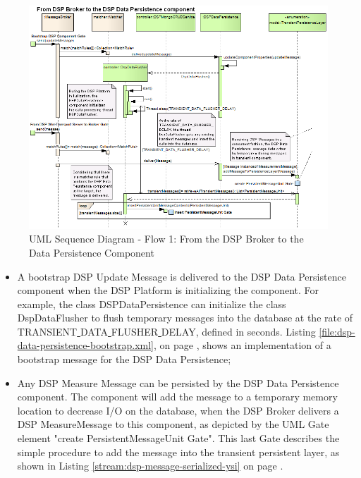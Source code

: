 \begin{figure}[!h]
  \centering
  \includegraphics[scale=0.6]{../diagrams/From-DSP-Broker-To-DSPDataPersistence-General-Sequence} 
  \caption{UML Sequence Diagram - Flow 1: From the DSP Broker to the Data Persistence Component}
  \label{fig:From-DSP-Broker-To-DSPDataPersistence-General-Sequence}
\end{figure}

\begin{itemize}
  \item A bootstrap DSP Update Message is delivered to the DSP Data Persistence
  component when the DSP Platform is initializing the component. For example, the
  class DSPDataPersistence can initialize the class DspDataFlusher to
  flush temporary messages into the database at the rate of
  TRANSIENT\underline{ }DATA\underline{ }FLUSHER\underline{ }DELAY, defined in 
  seconds. 
  Listing \ref{file:dsp-data-persistence-bootstrap.xml}, on page
  \pageref{file:dsp-data-persistence-bootstrap.xml}, shows an implementation of
  a bootstrap message for the DSP Data Persistence;
  \item Any DSP Measure Message can be persisted by the DSP Data Persistence
  component. The component will add the message to a temporary memory location
  to decrease I/O on the database, when the DSP Broker delivers a DSP
  MeasureMessage to this component, as depicted by the UML Gate element
  \cite{uml-seq-gate} "create PersistentMessageUnit Gate". This last Gate
  describes the simple procedure to add the message into the transient
  persistent layer, as shown in Listing
  \ref{stream:dsp-message-serialized-ysi} on page
  \pageref{stream:dsp-message-serialized-ysi}.
\end{itemize}

